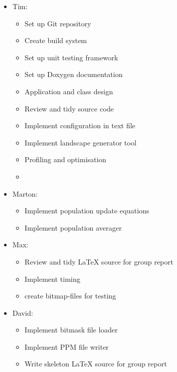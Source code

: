 \begin{itemize}
 \item Tim:
  \begin{itemize}
        \item Set up Git repository
	\item Create build system
	\item Set up unit testing framework
	\item Set up Doxygen documentation
	\item Application and class design
	\item Review and tidy source code
	\item Implement configuration in text file
	\item Implement landscape generator tool
	\item Profiling and optimisation
	\item 
   \end{itemize}

  \item Marton:
    \begin{itemize}
	\item Implement population update equations
	\item Implement population averager
    \end{itemize}

 \item Max:
  \begin{itemize}
        \item Review and tidy LaTeX source for group report
	\item Implement timing
	\item create bitmap-files for testing
   \end{itemize}

\item David:
  \begin{itemize}
	\item Implement bitmask file loader
	\item Implement PPM file writer
	\item Write skeleton LaTeX source for group report
  \end{itemize}



\end{itemize}
 